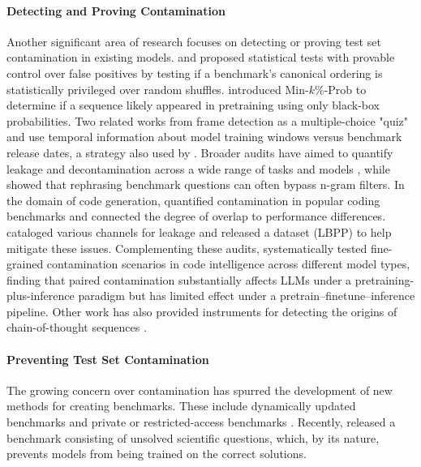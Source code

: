 \paragraph{Detecting and Proving Contamination}
Another significant area of research focuses on detecting or proving test set contamination in existing models. \citet{oren2023proving} and \citet{ni2025trainingbenchmarkneed} proposed statistical tests with provable control over false positives by testing if a benchmark's canonical ordering is statistically privileged over random shuffles. \citet{shi2024detecting} introduced Min-$k\%$-Prob to determine if a sequence likely appeared in pretraining using only black-box probabilities. Two related works from \citet{golchin2023data,golchin2024time} frame detection as a multiple-choice "quiz" and use temporal information about model training windows versus benchmark release dates, a strategy also used by \citet{roberts2024to}. Broader audits have aimed to quantify leakage and decontamination across a wide range of tasks and models \citep{xu2024benchmarkingbenchmarkleakagelarge,deng2024investigating,li2024opensource}, while \citet{yang2023rethinking} showed that rephrasing benchmark questions can often bypass n-gram filters. In the domain of code generation, \citet{riddell2024quantifying} quantified contamination in popular coding benchmarks and connected the degree of overlap to performance differences. \citet{matton2024leakage} cataloged various channels for leakage and released a dataset (LBPP) to help mitigate these issues. Complementing these audits, \citet{yang2025rethinkingeffectsdatacontamination} systematically tested fine-grained contamination scenarios in code intelligence across different model types, finding that paired contamination substantially affects LLMs under a pretraining-plus-inference paradigm but has limited effect under a pretrain–finetune–inference pipeline. Other work has also provided instruments for detecting the origins of chain-of-thought sequences \citep{li2025diagnosing}.

\paragraph{Preventing Test Set Contamination}
The growing concern over contamination has spurred the development of new methods for creating benchmarks. These include dynamically updated benchmarks \citep{jain2025livecodebench, xia2024top, zhang2025dynamicbenchmarkconstructionevaluating, qian2024varbenchrobustlanguagemodel} and private or restricted-access benchmarks \citep{zhang2024carefulexaminationlargelanguage, glazer2025frontiermathbenchmarkevaluatingadvanced}. Recently, \citet{nie2025uqassessinglanguagemodels} released a benchmark consisting of unsolved scientific questions, which, by its nature, prevents models from being trained on the correct solutions.

